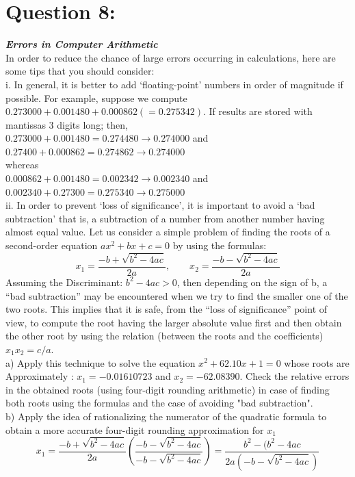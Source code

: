 \documentclass[a4paper,12pt]{article}
\begin{document}
\section*{\LARGE Question 8:}
\emph{\textbf{Errors in Computer Arithmetic}}\\
In order to reduce the chance of large errors occurring in calculations, here are some tips that you should consider:\\[0.5cm]
i. In general, it is better to add ‘floating-point’ numbers in order of magnitude if possible. For example, suppose we compute
$0.273000+0.001480+0.000862 (=0.275342).$ If results are stored with mantissas 3 digits long; then,\\[0.2cm]
$0.273000 + 0.001480 = 0.274480  \rightarrow 0.274000$ and\\[0.2cm]
$0.27400 + 0.000862 = 0.274862  \rightarrow 0.274000$\\[0.2cm]
whereas\\[0.2cm]
$0.000862 + 0.001480 = 0.002342  \rightarrow 0.002340$ and\\[0.2cm]
$0.002340 + 0.27300 = 0.275340  \rightarrow 0.275000$\\[0.2cm]
ii. In order to prevent ‘loss of significance’, it is important to avoid a ‘bad subtraction’ that is, a subtraction of a number from another number having almost equal value. Let us consider a simple problem of finding the roots of a second-order equation $ax^2 + bx +c=0$ by using the formulas:
 \[x_1= \dfrac{-b+\sqrt{b^2-4ac}}{2a},\qquad x_2= \dfrac{-b-\sqrt{b^2-4ac}}{2a}\]
 Assuming the Discriminant: $b^2 - 4ac > 0$, then depending on the sign of b, a “bad subtraction” may be encountered when we try to find the smaller one of the two roots. This implies that it is safe, from the “loss of significance” point of view, to compute the root having the larger absolute value first and then obtain the other root by using the relation (between the roots and the coefficients) $x_1x_2= c/a$.\\[0.3cm]
 a) Apply this technique to solve the equation $x^2 + 62.10 x + 1 = 0$ whose roots are
Approximately : $x_1 = -0.01610723$ and $x_2= -62.08390$. Check the relative errors in the obtained roots (using four-digit rounding arithmetic) in case of finding both roots using the formulas and the case of avoiding "bad subtraction".\\[0.4cm]
b) Apply the idea of rationalizing the numerator of the quadratic formula to obtain a more accurate four-digit rounding approximation for $x_1$
\[x_1 = \dfrac{-b+\sqrt{b^2-4ac}}{2a} \left(\dfrac{-b-\sqrt{b^2-4ac}}{-b-\sqrt{b^2-4ac}} \right)= \dfrac{b^2 - (b^2-4ac}{2a(-b-\sqrt{b^2-4ac})}\]
\end{document}
